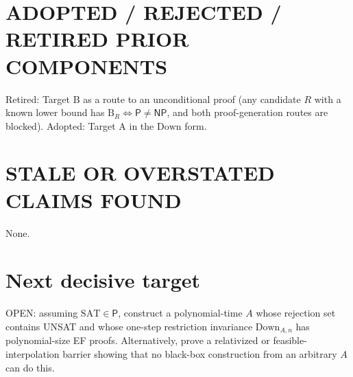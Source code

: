 \documentclass[11pt]{article}
\newcommand{\SAT}{\mathrm{SAT}}
\newcommand{\Pc}{\mathsf P}
\newcommand{\NP}{\mathsf{NP}}
\newcommand{\Down}{\mathrm{Down}}
\begin{document}
\section*{ADOPTED / REJECTED / RETIRED PRIOR COMPONENTS}
Retired: Target B as a route to an unconditional proof (any candidate $R$
with a known lower bound has $\mathrm B_R\Leftrightarrow\Pc\ne\NP$, and both
proof-generation routes are blocked). Adopted: Target A in the $\Down$ form.

\section*{STALE OR OVERSTATED CLAIMS FOUND}
None.

\section*{Next decisive target}
OPEN: assuming $\SAT\in\Pc$, construct a polynomial-time $A$ whose
rejection set contains UNSAT and whose one-step restriction invariance
$\Down_{A,n}$ has polynomial-size EF proofs. Alternatively, prove a
relativized or feasible-interpolation barrier showing that no
black-box construction from an arbitrary $A$ can do this.
\end{document}

